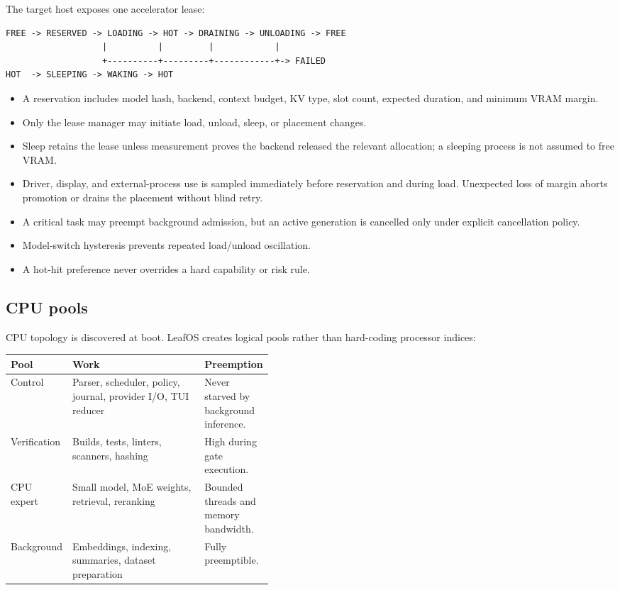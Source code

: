\documentclass[11pt,letterpaper]{article}
\begin{document}
The target host exposes one accelerator lease:

\begin{lstlisting}
FREE -> RESERVED -> LOADING -> HOT -> DRAINING -> UNLOADING -> FREE
                   |          |         |            |
                   +----------+---------+------------+-> FAILED
HOT  -> SLEEPING -> WAKING -> HOT
\end{lstlisting}

\begin{itemize}
  \item A reservation includes model hash, backend, context budget, KV type,
        slot count, expected duration, and minimum VRAM margin.
  \item Only the lease manager may initiate load, unload, sleep, or placement
        changes.
  \item Sleep retains the lease unless measurement proves the backend released
        the relevant allocation; a sleeping process is not assumed to free VRAM.
  \item Driver, display, and external-process use is sampled immediately before
        reservation and during load. Unexpected loss of margin aborts promotion
        or drains the placement without blind retry.
  \item A critical task may preempt background admission, but an active
        generation is cancelled only under explicit cancellation policy.
  \item Model-switch hysteresis prevents repeated load/unload oscillation.
  \item A hot-hit preference never overrides a hard capability or risk rule.
\end{itemize}

\subsection{CPU pools}

CPU topology is discovered at boot. LeafOS creates logical pools rather than
hard-coding processor indices:

\begin{tabularx}{\linewidth}{@{}L{0.23\linewidth}Y L{0.20\linewidth}@{}}
\toprule
\textbf{Pool} & \textbf{Work} & \textbf{Preemption} \\
\midrule
Control &
Parser, scheduler, policy, journal, provider I/O, TUI reducer &
Never starved by background inference. \\
Verification &
Builds, tests, linters, scanners, hashing &
High during gate execution. \\
CPU expert &
Small model, MoE weights, retrieval, reranking &
Bounded threads and memory bandwidth. \\
Background &
Embeddings, indexing, summaries, dataset preparation &
Fully preemptible. \\
\bottomrule
\end{tabularx}
\end{document}
